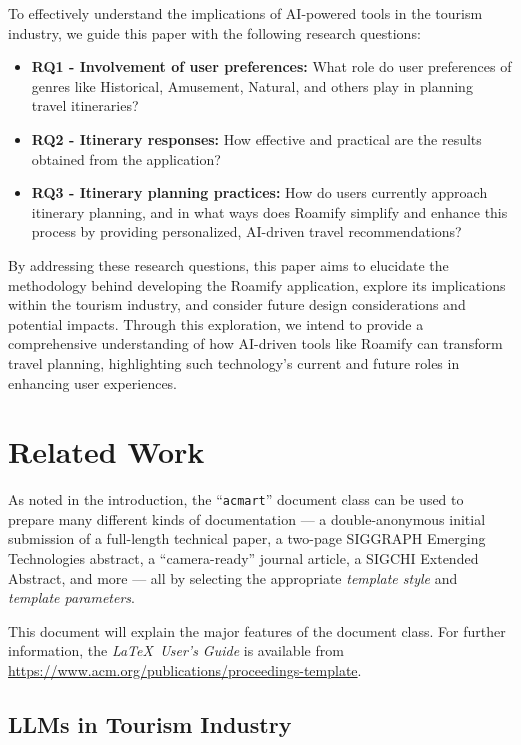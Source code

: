 \documentclass[sigconf,authordraft]{acmart}
\begin{document}
To effectively understand the implications of AI-powered tools in the tourism industry, we guide this paper with the following research questions:

\begin{itemize}
    \item \textbf{RQ1 - Involvement of user preferences:} What role do user preferences of genres like Historical, Amusement, Natural, and others play in planning travel itineraries?
    \item \textbf{RQ2 - Itinerary responses:} How effective and practical are the results obtained from the application?
    \item \textbf{RQ3 - Itinerary planning practices:} How do users currently approach itinerary planning, and in what ways does Roamify simplify and enhance this process by providing personalized, AI-driven travel recommendations?
\end{itemize}

By addressing these research questions, this paper aims to elucidate the methodology behind developing the Roamify application, explore its implications within the tourism industry, and consider future design considerations and potential impacts. Through this exploration, we intend to provide a comprehensive understanding of how AI-driven tools like Roamify can transform travel planning, highlighting such technology's current and future roles in enhancing user experiences.

\section{Related Work}
As noted in the introduction, the ``\verb|acmart|'' document class can
be used to prepare many different kinds of documentation --- a
double-anonymous initial submission of a full-length technical paper, a
two-page SIGGRAPH Emerging Technologies abstract, a ``camera-ready''
journal article, a SIGCHI Extended Abstract, and more --- all by
selecting the appropriate {\itshape template style} and {\itshape
  template parameters}.

This document will explain the major features of the document
class. For further information, the {\itshape \LaTeX\ User's Guide} is
available from
\url{https://www.acm.org/publications/proceedings-template}.

\subsection{LLMs in Tourism Industry}
\end{document}

